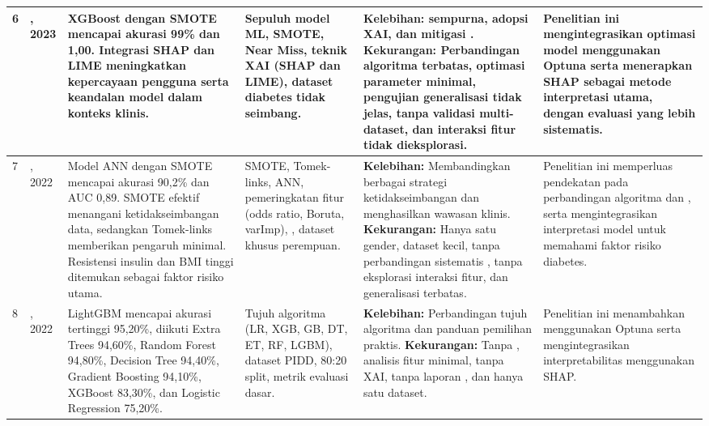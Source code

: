 \begin{landscape}
\begin{longtable}{|C{0.7cm}|L{2.9cm}|L{5.4cm}|L{3.0cm}|L{4.4cm}|L{3.7cm}|}
6 & , 2023 \cite{ref29} & XGBoost dengan SMOTE mencapai akurasi 99\% dan  1,00. Integrasi SHAP dan LIME meningkatkan kepercayaan pengguna serta keandalan model dalam konteks klinis. & Sepuluh model ML, SMOTE, Near Miss, teknik XAI (SHAP dan LIME), dataset diabetes tidak seimbang. & \textbf{Kelebihan:}  sempurna, adopsi XAI, dan mitigasi . \newline\textbf{Kekurangan:} Perbandingan algoritma terbatas, optimasi parameter minimal, pengujian generalisasi tidak jelas, tanpa validasi multi-dataset, dan interaksi fitur tidak dieksplorasi. & Penelitian ini mengintegrasikan optimasi model menggunakan Optuna serta menerapkan SHAP sebagai metode interpretasi utama, dengan evaluasi yang lebih sistematis.\\ \hline

7 & , 2022 \cite{ref16} & Model ANN dengan SMOTE mencapai akurasi 90,2\% dan AUC 0,89. SMOTE efektif menangani ketidakseimbangan data, sedangkan Tomek-links memberikan pengaruh minimal. Resistensi insulin dan BMI tinggi ditemukan sebagai faktor risiko utama. & SMOTE, Tomek-links, ANN, pemeringkatan fitur (odds ratio, Boruta, varImp), , dataset khusus perempuan. & \textbf{Kelebihan:} Membandingkan berbagai strategi ketidakseimbangan dan menghasilkan wawasan klinis. \newline\textbf{Kekurangan:} Hanya satu gender, dataset kecil, tanpa perbandingan sistematis , tanpa eksplorasi interaksi fitur, dan generalisasi terbatas. & Penelitian ini memperluas pendekatan pada perbandingan algoritma  dan , serta mengintegrasikan interpretasi model untuk memahami faktor risiko diabetes.\\ \hline

8 & , 2022 \cite{ref14} & LightGBM mencapai akurasi tertinggi 95,20\%, diikuti Extra Trees 94,60\%, Random Forest 94,80\%, Decision Tree 94,40\%, Gradient Boosting 94,10\%, XGBoost 83,30\%, dan Logistic Regression 75,20\%. & Tujuh algoritma (LR, XGB, GB, DT, ET, RF, LGBM), dataset PIDD, 80:20 split, metrik evaluasi dasar. & \textbf{Kelebihan:} Perbandingan tujuh algoritma dan panduan pemilihan praktis. \newline\textbf{Kekurangan:} Tanpa , analisis fitur minimal, tanpa XAI, tanpa laporan , dan hanya satu dataset. & Penelitian ini menambahkan  menggunakan Optuna serta mengintegrasikan interpretabilitas menggunakan SHAP.\\ \hline


\end{longtable}
\end{landscape}
